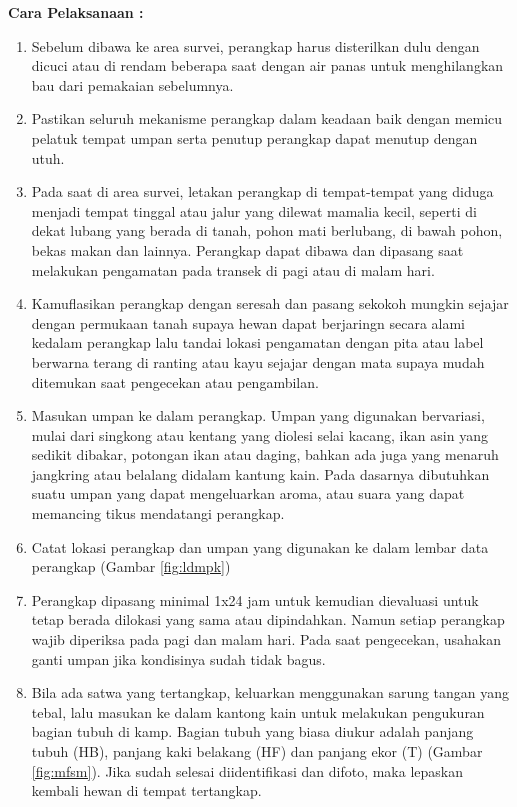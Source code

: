 \documentclass[
]{book}
\providecommand{\tightlist}{%
  \setlength{\itemsep}{0pt}\setlength{\parskip}{0pt}}
\begin{document}
\textbf{Cara Pelaksanaan :}

\begin{enumerate}
\def\labelenumi{\arabic{enumi}.}
\tightlist
\item
  Sebelum dibawa ke area survei, perangkap harus disterilkan dulu dengan dicuci atau di rendam beberapa saat dengan air panas untuk menghilangkan bau dari pemakaian sebelumnya.
\item
  Pastikan seluruh mekanisme perangkap dalam keadaan baik dengan memicu pelatuk tempat umpan serta penutup perangkap dapat menutup dengan utuh.
\item
  Pada saat di area survei, letakan perangkap di tempat-tempat yang diduga menjadi tempat tinggal atau jalur yang dilewat mamalia kecil, seperti di dekat lubang yang berada di tanah, pohon mati berlubang, di bawah pohon, bekas makan dan lainnya. Perangkap dapat dibawa dan dipasang saat melakukan pengamatan pada transek di pagi atau di malam hari.
\item
  Kamuflasikan perangkap dengan seresah dan pasang sekokoh mungkin sejajar dengan permukaan tanah supaya hewan dapat berjaringn secara alami kedalam perangkap lalu tandai lokasi pengamatan dengan pita atau label berwarna terang di ranting atau kayu sejajar dengan mata supaya mudah ditemukan saat pengecekan atau pengambilan.
\item
  Masukan umpan ke dalam perangkap. Umpan yang digunakan bervariasi, mulai dari singkong atau kentang yang diolesi selai kacang, ikan asin yang sedikit dibakar, potongan ikan atau daging, bahkan ada juga yang menaruh jangkring atau belalang didalam kantung kain. Pada dasarnya dibutuhkan suatu umpan yang dapat mengeluarkan aroma, atau suara yang dapat memancing tikus mendatangi perangkap.
\item
  Catat lokasi perangkap dan umpan yang digunakan ke dalam lembar data perangkap (Gambar \ref{fig:ldmpk})
\item
  Perangkap dipasang minimal 1x24 jam untuk kemudian dievaluasi untuk tetap berada dilokasi yang sama atau dipindahkan. Namun setiap perangkap wajib diperiksa pada pagi dan malam hari. Pada saat pengecekan, usahakan ganti umpan jika kondisinya sudah tidak bagus.
\item
  Bila ada satwa yang tertangkap, keluarkan menggunakan sarung tangan yang tebal, lalu masukan ke dalam kantong kain untuk melakukan pengukuran bagian tubuh di kamp. Bagian tubuh yang biasa diukur adalah panjang tubuh (HB), panjang kaki belakang (HF) dan panjang ekor (T) (Gambar \ref{fig:mfsm}). Jika sudah selesai diidentifikasi dan difoto, maka lepaskan kembali hewan di tempat tertangkap.
\end{enumerate}
\end{document}
